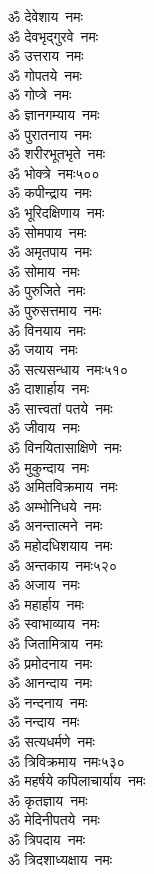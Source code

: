 \begin{multicols}{2}
\begin{flushleft}
ॐ देवेशाय~नमः\\
ॐ देवभृद्गुरवे~नमः\\
ॐ उत्तराय~नमः\\
ॐ गोपतये~नमः\\
ॐ गोप्त्रे~नमः\\
ॐ ज्ञानगम्याय~नमः\\
ॐ पुरातनाय~नमः\\
ॐ शरीरभूतभृते~नमः\\
ॐ भोक्त्रे~नमः\hfill ५००\\
ॐ कपीन्द्राय~नमः\\
ॐ भूरिदक्षिणाय~नमः\\
ॐ सोमपाय~नमः\\
ॐ अमृतपाय~नमः\\
ॐ सोमाय~नमः\\
ॐ पुरुजिते~नमः\\
ॐ पुरुसत्तमाय~नमः\\
ॐ विनयाय~नमः\\
ॐ जयाय~नमः\\
ॐ सत्यसन्धाय~नमः\hfill ५१०\\
ॐ दाशार्हाय~नमः\\
ॐ सात्त्वतां पतये~नमः\\
ॐ जीवाय~नमः\\
ॐ विनयितासाक्षिणे~नमः\\
ॐ मुकुन्दाय~नमः\\
ॐ अमितविक्रमाय~नमः\\
ॐ अम्भोनिधये~नमः\\
ॐ अनन्तात्मने~नमः\\
ॐ महोदधिशयाय~नमः\\
ॐ अन्तकाय~नमः\hfill ५२०\\
ॐ अजाय~नमः\\
ॐ महार्हाय~नमः\\
ॐ स्वाभाव्याय~नमः\\
ॐ जितामित्राय~नमः\\
ॐ प्रमोदनाय~नमः\\
ॐ आनन्दाय~नमः\\
ॐ नन्दनाय~नमः\\
ॐ नन्दाय~नमः\\
ॐ सत्यधर्मणे~नमः\\
ॐ त्रिविक्रमाय~नमः\hfill ५३०\\
ॐ महर्षये कपिलाचार्याय~नमः\\
ॐ कृतज्ञाय~नमः\\
ॐ मेदिनीपतये~नमः\\
ॐ त्रिपदाय~नमः\\
ॐ त्रिदशाध्यक्षाय~नमः\\

\end{flushleft}
\end{multicols}
